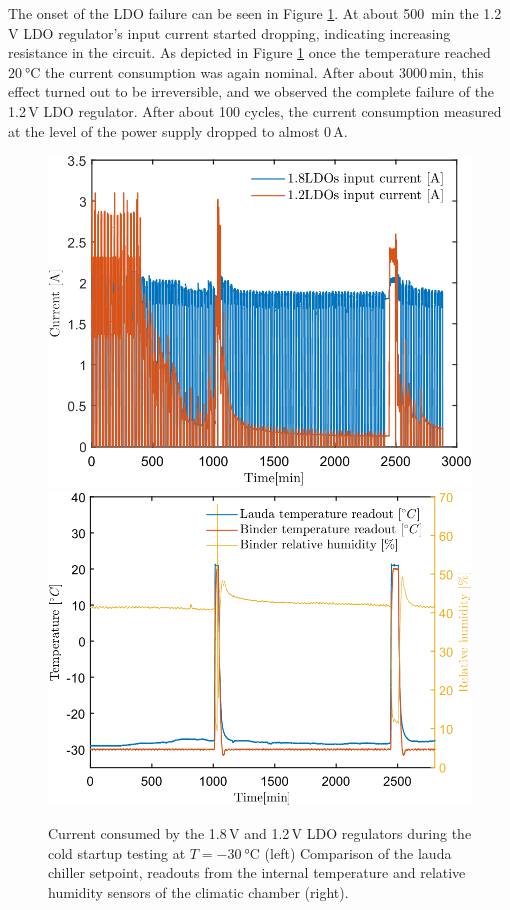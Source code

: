 \begin{table}[!h]
\centering
\caption{Detailed description of the \gls{LDO} failure with regard to the type and number of cycles.}
\label{tab:SetA}
\end{table}
\newpage
The onset of the \gls{LDO} failure can be seen in Figure \ref{fig_cold_startup}. At about \SI{500}{\minute} the 1.2\,V LDO regulator's input current started dropping, indicating increasing resistance in the circuit. As depicted in Figure \ref{fig_cold_startup} once the temperature reached $\SI{20}{\celsius}$ the current consumption was again nominal. After about  3000\,min, this effect turned out to be irreversible, and we observed the complete failure of the 1.2\,V \gls{LDO} regulator. After about 100 cycles, the current consumption measured at the level of the power supply dropped to almost 0\,A. 
\begin{figure}[!h]
\centering
\includegraphics[width=0.46\columnwidth]{Chapter4/images/currents_long.png}
\includegraphics[width=0.48\columnwidth]{Chapter4/images/cycling.png}
\caption{Current consumed by the 1.8\,V and 1.2\,V \gls{LDO} regulators during the cold startup testing at $T = \SI{-30}{\celsius}$ (left)
Comparison of the lauda chiller setpoint, readouts from the internal temperature and relative humidity sensors of the climatic chamber (right).}
\label{fig_cold_startup}
\end{figure}

